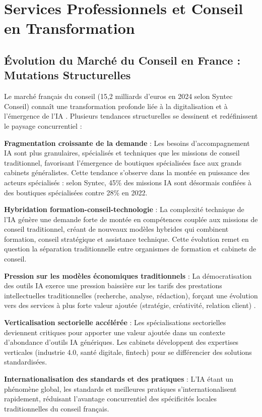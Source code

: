\section{Services Professionnels et Conseil en Transformation}

\subsection{Évolution du Marché du Conseil en France : Mutations Structurelles}

Le marché français du conseil (15,2 milliards d'euros en 2024 selon Syntec Conseil) connaît une transformation profonde liée à la digitalisation et à l'émergence de l'IA \cite{syntec2024ai}. Plusieurs tendances structurelles se dessinent et redéfinissent le paysage concurrentiel :

\textbf{Fragmentation croissante de la demande} : Les besoins d'accompagnement IA sont plus granulaires, spécialisés et techniques que les missions de conseil traditionnel, favorisant l'émergence de boutiques spécialisées face aux grands cabinets généralistes. Cette tendance s'observe dans la montée en puissance des acteurs spécialisés : selon Syntec, 45\% des missions IA sont désormais confiées à des boutiques spécialisées contre 28\% en 2022.

\textbf{Hybridation formation-conseil-technologie} : La complexité technique de l'IA génère une demande forte de montée en compétences couplée aux missions de conseil traditionnel, créant de nouveaux modèles hybrides qui combinent formation, conseil stratégique et assistance technique. Cette évolution remet en question la séparation traditionnelle entre organismes de formation et cabinets de conseil.

\textbf{Pression sur les modèles économiques traditionnels} : La démocratisation des outils IA exerce une pression baissière sur les tarifs des prestations intellectuelles traditionnelles (recherche, analyse, rédaction), forçant une évolution vers des services à plus forte valeur ajoutée (stratégie, créativité, relation client) \cite{mckinsey2023consulting_ai}.

\textbf{Verticalisation sectorielle accélérée} : Les spécialisations sectorielles deviennent critiques pour apporter une valeur ajoutée dans un contexte d'abondance d'outils IA génériques. Les cabinets développent des expertises verticales (industrie 4.0, santé digitale, fintech) pour se différencier des solutions standardisées.

\textbf{Internationalisation des standards et des pratiques} : L'IA étant un phénomène global, les standards et meilleures pratiques s'internationalisent rapidement, réduisant l'avantage concurrentiel des spécificités locales traditionnelles du conseil français.

